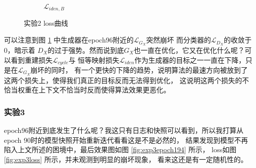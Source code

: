 \documentclass[twocolumn,11pt]{ctexart}
\begin{document}
\begin{figure}[htb]
\begin{subfigure}[b]{0.23\linewidth}
        \caption{$\mathcal{L}_{iden,B}$}
      \end{subfigure}
      \caption{实验2 loss曲线}
      \label{fig:exp2loss}
\end{figure}

可以注意到图 \ref{fig:exp2loss} 中生成器在epoch96附近的$\mathcal{L}_{G_X}$突然崩坏
而分类器的$\mathcal{L}_{D_X}$的收敛于0，暗示着
$D_X$的过于强势。然而说到底$G_X$也一直在优化，它又在优化什么呢？可以看到重建损失$\mathcal{L}_{cycle}$与
恒等映射损失$\mathcal{L}_{iden}$作为生成器的目标之一一直在下降，只是在$\mathcal{L}_{G_X}$崩坏的同时，
有一个更快的下降的趋势，说明算法的最速方向被放到了这两个损失上，使得我们真正的目标反而无法得到优化，
这说明这两个损失的不恰当权重在上下文不恰当时反而使得算法效果更恶化。

\subsubsection{实验3}

epoch96附近到底发生了什么呢？我这只有日志和快照可以看到，所以我打算从epoch 90时的模型快照开始重新迭代看看这是不是必然的，
结果发现到模型不再陷入上文所述的困境中，最后效果图如图 \ref{fig:exp3epoch194} 所示，
loss如图 \ref{fig:exp3loss} 所示，并未观测到明显的崩坏现象， 看来这还是有一定随机性的。
\end{document}
